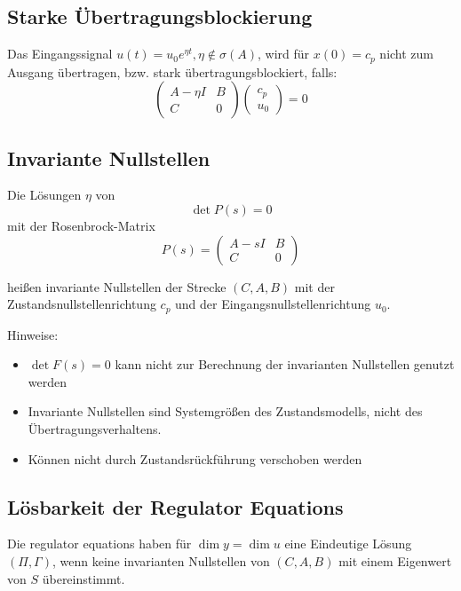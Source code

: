 \subsection{Starke Übertragungsblockierung}
Das Eingangssignal $u(t) = u_0 e^{\eta t}, \eta \notin \sigma(A)$, wird für $x(0)=c_p$
nicht zum Ausgang übertragen, bzw. stark übertragungsblockiert, falls:
\begin{equation}
    \begin{pmatrix}
        A - \eta I & B \\
        C & 0
    \end{pmatrix}
    \begin{pmatrix} c_p \\ u_0 \end{pmatrix} = 0
\end{equation}

\subsection{Invariante Nullstellen}
Die Lösungen $\eta$ von
\begin{equation}
    \det P(s) = 0
\end{equation}
mit der Rosenbrock-Matrix
\begin{equation}
    P(s) = 
    \begin{pmatrix}
        A - s I & B \\
        C & 0
    \end{pmatrix}
\end{equation}

heißen invariante Nullstellen der Strecke $(C, A, B)$ mit der Zustandsnullstellenrichtung
$c_p$ und der Eingangsnullstellenrichtung $u_0$.

Hinweise:
\begin{itemize}
    \item $\det F(s)=0$ kann nicht zur Berechnung der invarianten Nullstellen genutzt werden
    \item Invariante Nullstellen sind Systemgrößen des Zustandsmodells, nicht des
        Übertragungsverhaltens.
    \item Können nicht durch Zustandsrückführung verschoben werden
\end{itemize}

\subsection{Lösbarkeit der Regulator Equations}
Die \glqq{}regulator equations\grqq{} haben für $\dim y = \dim u$ eine Eindeutige Lösung
$(\Pi, \Gamma)$, wenn keine invarianten Nullstellen von $(C, A, B)$ mit einem
Eigenwert von $S$ übereinstimmt.

